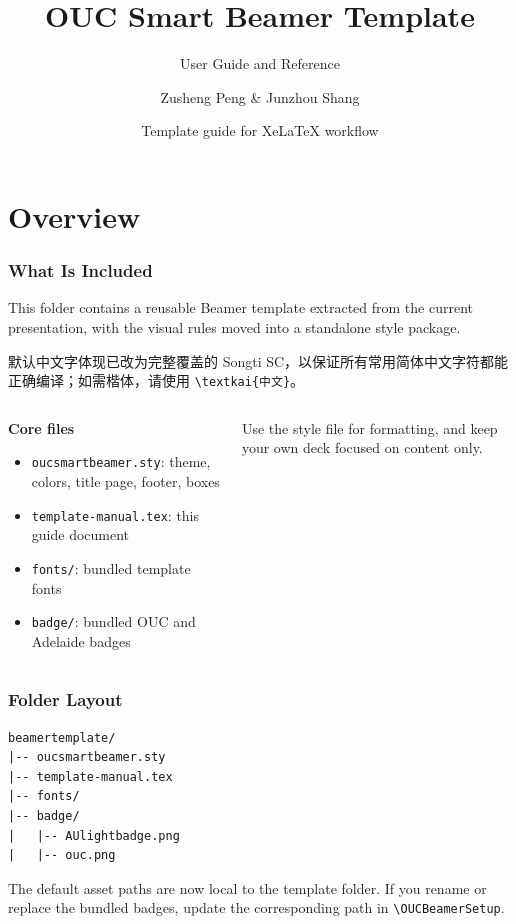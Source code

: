 \documentclass[aspectratio=169,10pt]{beamer}
\title{OUC Smart Beamer Template}
\subtitle{User Guide and Reference}
\author{Zusheng Peng \& Junzhou Shang}
\institute{Haide College, Ocean University of China}
\date{Template guide for XeLaTeX workflow}
\begin{document}
\OUCTitleFrame

\OUCTocFrame[Contents]

\section{Overview}

\begin{frame}
    \frametitle{What Is Included}
    \begin{infobox}
        This folder contains a reusable Beamer template extracted from the current presentation, with the visual rules moved into a standalone style package.
    \end{infobox}
    \begin{warnbox}
        默认中文字体现已改为完整覆盖的 Songti SC，以保证所有常用简体中文字符都能正确编译；如需楷体，请使用 \texttt{\textbackslash textkai\{中文\}}。
    \end{warnbox}
    \vspace{-3mm}
    \begin{columns}[T]
        \begin{resultbox}
            \textbf{Core files}
            \begin{itemize}
                \item \texttt{oucsmartbeamer.sty}: theme, colors, title page, footer, boxes
                \item \texttt{template-manual.tex}: this guide document
                \item \texttt{fonts/}: bundled template fonts
                \item \texttt{badge/}: bundled OUC and Adelaide badges
            \end{itemize}
        \end{resultbox}
        \begin{goalbox}
            \centering
            Use the style file for formatting, and keep your own deck focused on content only.
        \end{goalbox}
    \end{columns}
\end{frame}

\begin{frame}[fragile]
    \frametitle{Folder Layout}
    \begin{lstlisting}[language={[LaTeX]TeX}]
beamertemplate/
|-- oucsmartbeamer.sty
|-- template-manual.tex
|-- fonts/
|-- badge/
|   |-- AUlightbadge.png
|   |-- ouc.png
    \end{lstlisting}
    \begin{warnbox}
        The default asset paths are now local to the template folder. If you rename or replace the bundled badges, update the corresponding path in \texttt{\textbackslash OUCBeamerSetup}. 
    \end{warnbox}
\end{frame}
\end{document}
